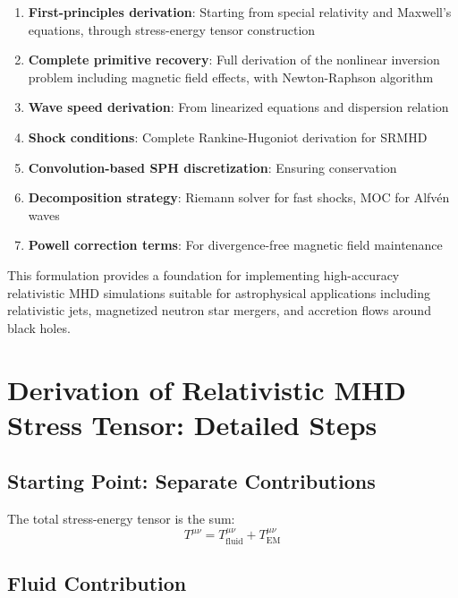 \documentclass[12pt,a4paper]{article}
\begin{document}
\begin{enumerate}
    \item \textbf{First-principles derivation}: Starting from special relativity and Maxwell's
        equations, through stress-energy tensor construction
    \item \textbf{Complete primitive recovery}: Full derivation of the nonlinear inversion
        problem including magnetic field effects, with Newton-Raphson algorithm
    \item \textbf{Wave speed derivation}: From linearized equations and dispersion relation
    \item \textbf{Shock conditions}: Complete Rankine-Hugoniot derivation for SRMHD
    \item \textbf{Convolution-based SPH discretization}: Ensuring conservation
    \item \textbf{Decomposition strategy}: Riemann solver for fast shocks, MOC for Alfv\'en waves
    \item \textbf{Powell correction terms}: For divergence-free magnetic field maintenance
\end{enumerate}

This formulation provides a foundation for implementing high-accuracy relativistic MHD
simulations suitable for astrophysical applications including relativistic jets,
magnetized neutron star mergers, and accretion flows around black holes.

\appendix

\section{Derivation of Relativistic MHD Stress Tensor: Detailed Steps}
\label{app:stress_tensor}

\subsection{Starting Point: Separate Contributions}

The total stress-energy tensor is the sum:
\begin{equation}
T^{\mu\nu} = T^{\mu\nu}_\text{fluid} + T^{\mu\nu}_\text{EM}
\end{equation}

\subsection{Fluid Contribution}
\end{document}
